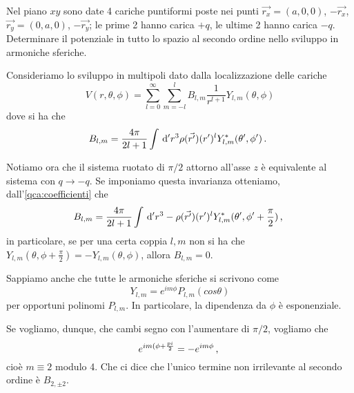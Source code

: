\documentclass[../main.tex]{subfiles}
\begin{document}

\textex
Nel piano $xy$ sono date 4 cariche puntiformi poste nei punti $\vec{r_x}=(a,0,0)$, $-\vec{r_x}$, $\vec{r_y}=(0,a,0)$, $-\vec{r_y}$; le prime 2 hanno carica $+q$, le ultime 2 hanno carica $-q$. Determinare il potenziale in tutto lo spazio al secondo ordine nello sviluppo in armoniche sferiche.

\solution

Consideriamo lo sviluppo in multipoli dato dalla localizzazione delle cariche
\begin{equation}\label{qca:multipoli}
	V(r,\theta,\phi)=\sum_{l=0}^{\infty} \sum_{m=-l}^l B_{l,m}\frac{1}{r^{l+1}}Y_{l,m}(\theta,\phi)
\end{equation}
dove si ha che
\begin{equation}\label{qca:coefficienti}
	B_{l,m}=\frac{4\pi}{2l+1}\int \,\mathrm d'r^3 \rho(\vec{r'})(r')^l Y_{l,m}^*(\theta',\phi')\, \text{. }
\end{equation}

Notiamo ora che il sistema ruotato di $\pi/2$ attorno all'asse $z$ è equivalente al sistema con $q\rightarrow -q$. Se imponiamo questa invarianza otteniamo, dall'\cref{qca:coefficienti} che 
\[
	B_{l,m}=\frac{4\pi}{2l+1}\int \,\mathrm d'r^3 -\rho(\vec{r'})(r')^l Y_{l,m}^*(\theta',\phi'+\frac{\pi}{2})\, \text{, }
\]
in particolare, se per una certa coppia $l,m$ non si ha che $Y_{l,m}(\theta,\phi+\frac{\pi}{2})=-Y_{l,m}(\theta,\phi)$, allora $B_{l,m}=0$.

Sappiamo anche che tutte le armoniche sferiche si scrivono come
\[
	Y_{l,m}=e^{im\phi}P_{l,m}(cos\theta)
\]
per opportuni polinomi $P_{l,m}$. In particolare, la dipendenza da $\phi$ è esponenziale.

Se vogliamo, dunque, che cambi segno con l'aumentare di $\pi/2$, vogliamo che
\[
	e^{im(\phi+\frac{pi}{2}}=-e^{im\phi}\, \text{, }
\]
cioè $m\equiv 2$ modulo 4. Che ci dice che l'unico termine non irrilevante al secondo ordine è $B_{2,\pm 2}$.
\end{document}
